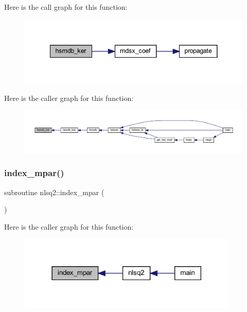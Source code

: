 Here is the call graph for this function\+:\nopagebreak
\begin{figure}[H]
\begin{center}
\leavevmode
\includegraphics[width=341pt]{Leroi_8f90_aa06a6e2460dd29bc7e4cd0f7378aa005_cgraph}
\end{center}
\end{figure}
Here is the caller graph for this function\+:\nopagebreak
\begin{figure}[H]
\begin{center}
\leavevmode
\includegraphics[width=350pt]{Leroi_8f90_aa06a6e2460dd29bc7e4cd0f7378aa005_icgraph}
\end{center}
\end{figure}
\mbox{\label{Leroi_8f90_a8c37d1a01918b1ce0560e8266f72f118}} 
\subsubsection{\texorpdfstring{index\+\_\+mpar()}{index\_mpar()}}
{\footnotesize\ttfamily subroutine nlsq2\+::index\+\_\+mpar (\begin{DoxyParamCaption}{ }\end{DoxyParamCaption})}

Here is the caller graph for this function\+:\nopagebreak
\begin{figure}[H]
\begin{center}
\leavevmode
\includegraphics[width=297pt]{Leroi_8f90_a8c37d1a01918b1ce0560e8266f72f118_icgraph}
\end{center}
\end{figure}
\mbox{\label{Leroi_8f90_a784bd3a2054098804d271da41cb44b09}} 
